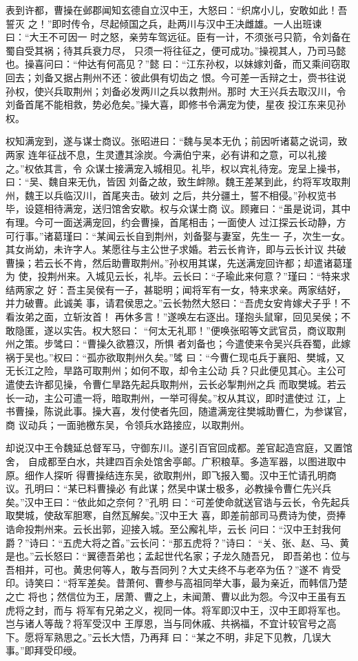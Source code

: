 表到许都，曹操在邺郡闻知玄德自立汉中王，大怒曰：“织席小儿，安敢如此！吾誓灭
之！”即时传令，尽起倾国之兵，赴两川与汉中王决雌雄。一人出班谏曰：“大王不可因一
时之怒，亲劳车驾远征。臣有一计，不须张弓只箭，令刘备在蜀自受其祸；待其兵衰力尽，
只须一将往征之，便可成功。”操视其人，乃司马懿也。操喜问曰：“仲达有何高见？”懿
曰：“江东孙权，以妹嫁刘备，而又乘间窃取回去；刘备又据占荆州不还：彼此俱有切齿之
恨。今可差一舌辩之士，赍书往说孙权，使兴兵取荆州；刘备必发两川之兵以救荆州。那时
大王兴兵去取汉川，令刘备首尾不能相救，势必危矣。”操大喜，即修书令满宠为使，星夜
投江东来见孙权。

权知满宠到，遂与谋士商议。张昭进曰：“魏与吴本无仇；前因听诸葛之说词，致两家
连年征战不息，生灵遭其涂炭。今满伯宁来，必有讲和之意，可以礼接之。”权依其言，令
众谋士接满宠入城相见。礼毕，权以宾礼待宠。宠呈上操书，曰：“吴、魏自来无仇，皆因
刘备之故，致生衅隙。魏王差某到此，约将军攻取荆州，魏王以兵临汉川，首尾夹击。破刘
之后，共分疆土，誓不相侵。”孙权览书毕，设筵相待满宠，送归馆舍安歇。权与众谋士商
议。顾雍曰：“虽是说词，其中有理。今可一面送满宠回，约会曹操，首尾相击；一面使人
过江探云长动静，方可行事。”诸葛瑾曰：“某闻云长自到荆州，刘备娶与妻室，先生一
子，次生一女。其女尚幼，未许字人。某愿往与主公世子求婚。若云长肯许，即与云长计议
共破曹操；若云长不肯，然后助曹取荆州。”孙权用其谋，先送满宠回许都；却遣诸葛瑾为
使，投荆州来。入城见云长，礼毕。云长曰：“子瑜此来何意？”瑾曰：“特来求结两家之
好：吾主吴侯有一子，甚聪明；闻将军有一女，特来求亲。两家结好，并力破曹。此诚美
事，请君侯思之。”云长勃然大怒曰：“吾虎女安肯嫁犬子乎！不看汝弟之面，立斩汝首！
再休多言！”遂唤左右逐出。瑾抱头鼠窜，回见吴侯；不敢隐匿，遂以实告。权大怒曰：
“何太无礼耶！”便唤张昭等文武官员，商议取荆州之策。步骘曰：“曹操久欲篡汉，所惧
者刘备也；今遣使来令吴兴兵吞蜀，此嫁祸于吴也。”权曰：“孤亦欲取荆州久矣。”骘
曰：“今曹仁现屯兵于襄阳、樊城，又无长江之险，旱路可取荆州；如何不取，却令主公动
兵？只此便见其心。主公可遣使去许都见操，令曹仁旱路先起兵取荆州，云长必掣荆州之兵
而取樊城。若云长一动，主公可遣一将，暗取荆州，一举可得矣。”权从其议，即时遣使过
江，上书曹操，陈说此事。操大喜，发付使者先回，随遣满宠往樊城助曹仁，为参谋官，商
议动兵；一面驰檄东吴，令领兵水路接应，以取荆州。

却说汉中王令魏延总督军马，守御东川。遂引百官回成都。差官起造宫庭，又置馆舍，
自成都至白水，共建四百余处馆舍亭邮。广积粮草。多造军器，以图进取中原。细作人探听
得曹操结连东吴，欲取荆州，即飞报入蜀。汉中王忙请孔明商议。孔明曰：“某已料曹操必
有此谋；然吴中谋士极多，必教操令曹仁先兴兵矣。”汉中王曰：“依此如之奈何？”孔明
曰：“可差使命就送官诰与云长，令先起兵取樊城，使敌军胆寒，自然瓦解矣。”汉中王大
喜，即差前部司马费诗为使，赍捧诰命投荆州来。云长出郭，迎接入城。至公廨礼毕，云长
问曰：“汉中王封我何爵？”诗曰：“五虎大将之首。”云长问：“那五虎将？”诗曰：
“关、张、赵、马、黄是也。”云长怒曰：“翼德吾弟也；孟起世代名家；子龙久随吾兄，
即吾弟也：位与吾相并，可也。黄忠何等人，敢与吾同列？大丈夫终不与老卒为伍？”遂不
肯受印。诗笑曰：“将军差矣。昔萧何、曹参与高祖同举大事，最为亲近，而韩信乃楚之亡
将也；然信位为王，居萧、曹之上，未闻萧、曹以此为怨。今汉中王虽有五虎将之封，而与
将军有兄弟之义，视同一体。将军即汉中王，汉中王即将军也。岂与诸人等哉？将军受汉中
王厚恩，当与同休戚、共祸福，不宜计较官号之高下。愿将军熟思之。”云长大悟，乃再拜
曰：“某之不明，非足下见教，几误大事。”即拜受印绶。

